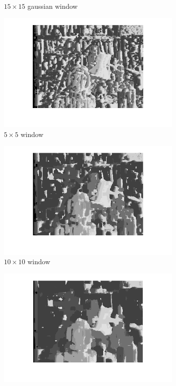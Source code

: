\documentclass{article}
\begin{document}
\begin{figure}[ht!]
\begin{subfigure}{.3\textwidth}
  \caption{$15\times15$ gaussian window}
  \label{fig_a3} 
 \end{subfigure}
 
 \begin{subfigure}{.3\textwidth}
  \centering
  \includegraphics[width=\linewidth]{ex3/a5_5.png}
  \caption{$5\times5$ window}
  \label{fig_a1g}
 \end{subfigure}
 \begin{subfigure}{.3\textwidth}
  \centering
  \includegraphics[width=\linewidth]{ex3/a10_10.png}
  \caption{$10\times10$ window}
  \label{fig_a2g}
 \end{subfigure}
 \begin{subfigure}{.3\textwidth}
  \centering
  \includegraphics[width=1\linewidth]{ex3/a15_15.png}

\end{subfigure}
\end{figure}
\end{document}
